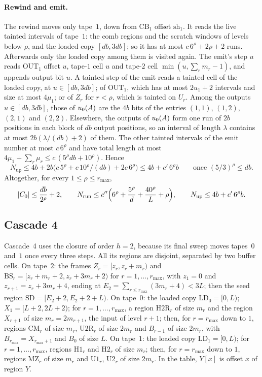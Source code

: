 \paragraph{Rewind and emit.} The rewind moves only tape~$1$, down from $\mathrm{CB}_1$ offset $\mathrm{sh}_1$. It reads the live tainted
intervals of tape~$1$: the comb regions and the scratch windows of levels below $\rho$, and the loaded copy $[db,3db]$; so it has at most
$c\,6^\rho+2\rho+2$ runs. Afterwards only the loaded copy among them is visited again. The emit's step $u$ reads $\mathrm{OUT}_1$
offset $u$, tape-$1$ cell $u$ and tape-$2$ cell $\min(u,\sum_rm_r-1)$, and appends output bit $u$. A tainted step of the emit reads a
tainted cell of the loaded copy, at $u\in[db,3db]$; of $\mathrm{OUT}_1$, which has at most $2u_1+2$ intervals and size at most $4\mu_1$;
or of $Z_r$ for $r<\rho$, which is tainted on $U_r$. Among the outputs $u\in[db,3db]$, those of $u_0(A)$ are the $4b$ bits of the
entries $(1,1)$, $(1,2)$, $(2,1)$ and $(2,2)$. Elsewhere, the outputs of $u_0(A)$ form one run of $2b$ positions in each block of $db$
output positions, so an interval of length $\lambda$ contains at most $2b(\lambda/(db)+2)$ of them. The other tainted intervals of the
emit number at most $c\,6^\rho$ and have total length at most $4\mu_1+\sum_r\mu_r\le c\,(5^\rho db+10^\rho)$. Hence
\[
  N_{\mathrm{up}}\le4b+2b\bigl(c\,5^\rho+c\,10^\rho/(db)+2c\,6^\rho\bigr)\le4b+c'\,6^\rho b\qquad\text{once }(5/3)^\rho\le db .
\]
Altogether, for every $1\le\rho\le r_{\max}$,
\begin{equation}\label{eq:c3-total}
  \lvert C_0 \rvert\le\frac{db}{2^\rho}+2,\qquad N_{\mathrm{run}}\le c''\Bigl(6^\rho+\frac{5^\rho}d+\frac{40^\rho}L+\rho\Bigr),\qquad
  N_{\mathrm{up}}\le4b+c'\,6^\rho b .
\end{equation}

\subsection{Cascade 4}\label{app:cascade4}

Cascade~4 uses the closure of order $h=2$, because its final sweep moves tapes~$0$ and~$1$ once every three steps. All its regions are
disjoint, separated by two buffer cells. On tape~$2$: the frames $Z_r=[z_r,z_r+m_r)$ and $\mathrm{BS}_r=[z_r+m_r+2,z_r+3m_r+2)$ for
$r=1,\dots,r_{\max}$, with $z_1=0$ and $z_{r+1}=z_r+3m_r+4$, ending at $E_2=\sum_{r\le r_{\max}}(3m_r+4)<3L$; then the seed region
$\mathrm{SD}=[E_2+2,E_2+2+L)$. On tape~$0$: the loaded copy $\mathrm{LD}_0=[0,L)$; $X_1=[L+2,2L+2)$; for $r=1,\dots,r_{\max}$, a region
$\mathrm{H2R}_r$ of size $m_r$ and the region $X_{r+1}$ of size $m_r=2m_{r+1}$, the input of level $r+1$; then, for $r=r_{\max}$ down to
$1$, regions $\mathrm{CM}_r$ of size $m_r$, $\mathrm{U2R}_r$ of size $2m_r$ and $B_{r-1}$ of size $2m_r$, with $B_{r_{\max}}=X_{r_{\max}+1}$
and $B_0$ of size $L$. On tape~$1$: the loaded copy $\mathrm{LD}_1=[0,L)$; for $r=1,\dots,r_{\max}$, regions $\mathrm{H1}_r$ and
$\mathrm{H2}_r$ of size $m_r$; then, for $r=r_{\max}$ down to $1$, regions $\mathrm{MZ}_r$ of size $m_r$ and $\mathrm{U1}_r$, $\mathrm{U2}_r$
of size $2m_r$. In the table, $Y[x]$ is offset $x$ of region $Y$.

